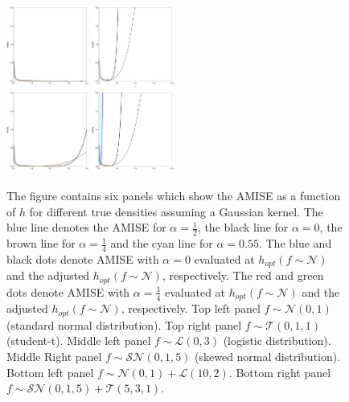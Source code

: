 \documentclass[
twoside,
openright,
titlepage,
numbers=noenddot,
headinclude,%
footinclude=true,
dottedtoc, %
ngerman,
american, %
pagesize=pdftex,
]{book}
\begin{document}
\begin{example}
\begin{figure}[H]
			\includegraphics[width=0.24\textwidth]{figures/AMISEExample/logistic}
			\includegraphics[width=0.24\textwidth]{figures/AMISEExample/skewnormal}\\
			\includegraphics[width=0.24\textwidth]{figures/AMISEExample/normal+logistic}
			\includegraphics[width=0.24\textwidth]{figures/AMISEExample/skewnormal+studentT}
			\caption{The figure contains six panels which show the AMISE as a function of $h$ for different true densities assuming a Gaussian kernel. The blue line denotes the AMISE for $\alpha=\frac{1}{2}$, the black line for $\alpha=0$, the brown line for $\alpha=\frac{1}{4}$ and the cyan line for $\alpha=0.55$. The blue and black dots denote AMISE with $\alpha=0$ evaluated at $h_{opt}(f\sim \mathcal{N})$ and the adjusted $h_{opt}(f\sim \mathcal{N})$, respectively. The red and green dots denote AMISE with $\alpha=\frac{1}{4}$ evaluated at $h_{opt}(f\sim \mathcal{N})$ and the adjusted $h_{opt}(f\sim \mathcal{N})$, respectively. Top left panel $f\sim \mathcal{N}(0,1)$ (standard normal distribution). Top right panel $f\sim \mathcal{T}(0,1,1)$ (student-t). Middle left panel $f\sim \mathcal{L}(0,3)$ (logistic distribution). Middle Right panel $f\sim \mathcal{SN}(0,1,5)$ (skewed normal distribution). Bottom left panel $f\sim \mathcal{N}(0,1)+\mathcal{L}(10,2)$. Bottom right panel $f\sim \mathcal{SN}(0,1,5)+\mathcal{T}(5,3,1)$.}

\end{figure}
\end{example}
\end{document}
